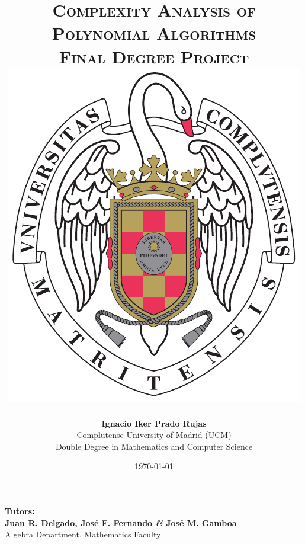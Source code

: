 \documentclass[11pt, a4paper, english, twoside, notitlepage, openright]{report}
\begin{document}
\begin{titlepage}

\title{\Huge{\textsc{Complexity Analysis of\\
Polynomial Algorithms}} \\
\vspace{0.5cm}
\Large{\textsc{Final Degree Project}}\\
\vspace{1.5cm}
\protect\includegraphics[scale=0.6]{escudo_ucm.pdf}
\vspace{1.5cm}}
\author{\textbf{Ignacio Iker Prado Rujas} \\
Complutense University of Madrid (UCM) \\
Double Degree in Mathematics and Computer Science}
\date{\today}
\maketitle
\thispagestyle{empty}

\vspace{1cm}
\begin{center}
\textbf{Tutors:} \\
\textbf{Juan R. Delgado, Jos\'e F. Fernando \textit{\&} Jos\'e M. Gamboa} \\
\vspace{0.1cm}
Algebra Department, Mathematics Faculty
\end{center}

\end{titlepage}
\end{document}
